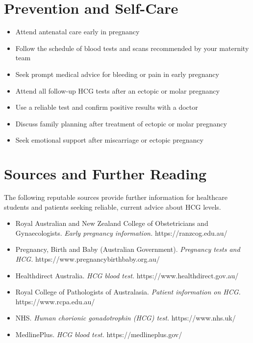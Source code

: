 \section*{Prevention and Self-Care}
\begin{itemize}
    \item Attend antenatal care early in pregnancy
    \item Follow the schedule of blood tests and scans recommended by your maternity team
    \item Seek prompt medical advice for bleeding or pain in early pregnancy
    \item Attend all follow-up HCG tests after an ectopic or molar pregnancy
    \item Use a reliable test and confirm positive results with a doctor
    \item Discuss family planning after treatment of ectopic or molar pregnancy
    \item Seek emotional support after miscarriage or ectopic pregnancy
\end{itemize}

\section*{Sources and Further Reading}
The following reputable sources provide further information for healthcare students and patients seeking reliable, current advice about HCG levels.

\begin{itemize}
    \item Royal Australian and New Zealand College of Obstetricians and Gynaecologists. \textit{Early pregnancy information.} https://ranzcog.edu.au/
    \item Pregnancy, Birth and Baby (Australian Government). \textit{Pregnancy tests and HCG.} https://www.pregnancybirthbaby.org.au/
    \item Healthdirect Australia. \textit{HCG blood test.} https://www.healthdirect.gov.au/
    \item Royal College of Pathologists of Australasia. \textit{Patient information on HCG.} https://www.rcpa.edu.au/
    \item NHS. \textit{Human chorionic gonadotrophin (HCG) test.} https://www.nhs.uk/
    \item MedlinePlus. \textit{HCG blood test.} https://medlineplus.gov/
\end{itemize}
